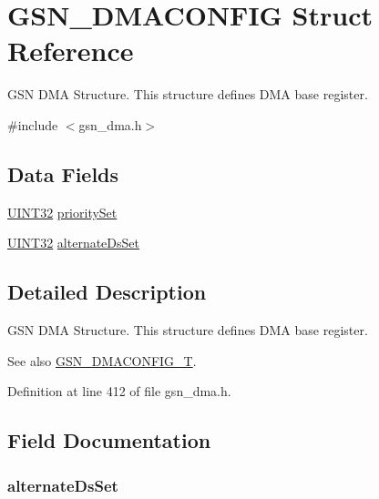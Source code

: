 \hypertarget{a00053}{
\section{GSN\_\-DMACONFIG Struct Reference}
\label{a00053}
}


GSN DMA Structure. This structure defines DMA base register.  




{\ttfamily \#include $<$gsn\_\-dma.h$>$}

\subsection*{Data Fields}
\begin{DoxyCompactItemize}
\item 
\hyperlink{a00660_gae1e6edbbc26d6fbc71a90190d0266018}{UINT32} \hyperlink{a00053_ae0862381c59e1675e1d630f6a1d28864}{prioritySet}
\item 
\hyperlink{a00660_gae1e6edbbc26d6fbc71a90190d0266018}{UINT32} \hyperlink{a00053_af113c16f417fc98755bace206320065c}{alternateDsSet}
\end{DoxyCompactItemize}


\subsection{Detailed Description}
GSN DMA Structure. This structure defines DMA base register. 

\begin{DoxySeeAlso}{See also}
\hyperlink{a00645_ga64a1083039794c33e6a904f799f730c5}{GSN\_\-DMACONFIG\_\-T}. 
\end{DoxySeeAlso}


Definition at line 412 of file gsn\_\-dma.h.



\subsection{Field Documentation}
\hypertarget{a00053_af113c16f417fc98755bace206320065c}{
\subsubsection[{alternateDsSet}]{ {\bf alternateDsSet}}}
\label{a00053_af113c16f417fc98755bace206320065c}


